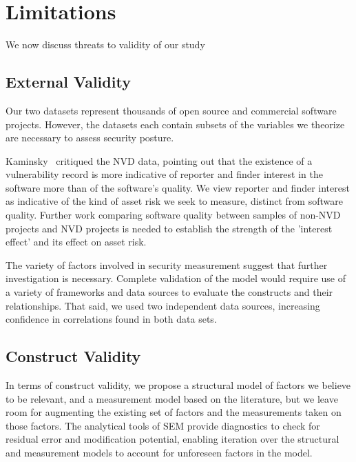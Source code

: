 \section{Limitations}
\label{sec:limitations}
We now discuss threats to validity of our study

\subsection{External Validity}
Our two datasets represent thousands of open source and commercial software projects. However, the datasets each contain subsets of the variables we theorize are necessary to assess security posture.   

Kaminsky~\cite{kaminsky2011showing} critiqued the NVD data, pointing out that the existence of a vulnerability record is more indicative of reporter and finder interest in the software more than of the software's quality. We view reporter and finder interest as indicative of the kind of asset risk we seek to measure, distinct from software quality. Further work comparing software quality between samples of non-NVD projects and NVD projects is needed to establish the strength of the 'interest effect' and its effect on asset risk.

The variety of factors involved in security measurement suggest that further investigation is necessary. Complete validation of the model would require use of a variety of frameworks and data sources to evaluate the constructs and their relationships. That said, we used two independent data sources, increasing confidence in correlations found in both data sets. 

\subsection{Construct Validity}
In terms of construct validity, we propose a structural model of factors we believe to be relevant, and a measurement model based on the literature, but we leave room for augmenting the existing set of factors and the measurements taken on those factors. The analytical tools of SEM provide diagnostics to check for residual error and modification potential, enabling iteration over the structural and measurement models to account for unforeseen factors in the model.  

  
